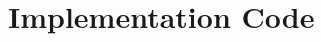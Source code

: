 
\chapter{Implementation Code} %

\label{AppendixA} %


\listoftables %
\label{lst:tabs}

\listoffigures %
\label{lst:figs}


%
%
